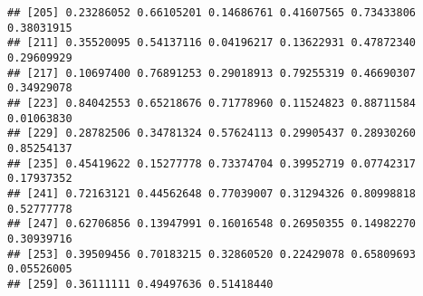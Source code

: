\documentclass[
]{article}
\newenvironment{Shaded}{\begin{snugshade}}{\end{snugshade}}
\newcommand{\FunctionTok}[1]{\textcolor[rgb]{0.13,0.29,0.53}{\textbf{#1}}}
\newcommand{\NormalTok}[1]{#1}
\newcommand{\OtherTok}[1]{\textcolor[rgb]{0.56,0.35,0.01}{#1}}
\newcommand{\SpecialCharTok}[1]{\textcolor[rgb]{0.81,0.36,0.00}{\textbf{#1}}}
\begin{document}
\begin{verbatim}
## [205] 0.23286052 0.66105201 0.14686761 0.41607565 0.73433806 0.38031915
## [211] 0.35520095 0.54137116 0.04196217 0.13622931 0.47872340 0.29609929
## [217] 0.10697400 0.76891253 0.29018913 0.79255319 0.46690307 0.34929078
## [223] 0.84042553 0.65218676 0.71778960 0.11524823 0.88711584 0.01063830
## [229] 0.28782506 0.34781324 0.57624113 0.29905437 0.28930260 0.85254137
## [235] 0.45419622 0.15277778 0.73374704 0.39952719 0.07742317 0.17937352
## [241] 0.72163121 0.44562648 0.77039007 0.31294326 0.80998818 0.52777778
## [247] 0.62706856 0.13947991 0.16016548 0.26950355 0.14982270 0.30939716
## [253] 0.39509456 0.70183215 0.32860520 0.22429078 0.65809693 0.05526005
## [259] 0.36111111 0.49497636 0.51418440
\end{verbatim}

\begin{Shaded}
\end{Shaded}
\end{document}

